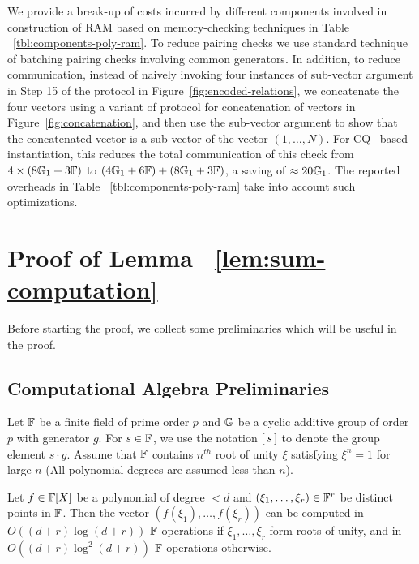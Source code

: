 \smallskip

We provide a break-up of costs incurred by different components involved in construction
of RAM based on memory-checking techniques in Table ~\ref{tbl:components-poly-ram}. To reduce pairing
checks we use standard technique of batching pairing checks involving common generators. In addition, to reduce
communication, instead of naively invoking four instances of sub-vector argument in Step 15 of the protocol
in Figure~\ref{fig:encoded-relations}, we concatenate the four vectors using a variant of protocol for
concatenation of vectors in Figure~\ref{fig:concatenation}, and then use the sub-vector argument to show that
the concatenated vector is a sub-vector of the vector $(1,\ldots,N)$. For CQ~\cite{EPRINT:EagFioGab22} based instantiation,
this reduces the total communication of this
check from $4\times (8\mathbb{G}_1 + 3\mathbb{F})$ to $(4\mathbb{G}_1+6\mathbb{F}) + (8\mathbb{G}_1 + 3\mathbb{F})$, a saving of $\approx 20\mathbb{G}_1$. The reported
overheads in Table ~\ref{tbl:components-poly-ram} take into account such optimizations.

\section{Proof of Lemma ~\ref{lem:sum-computation}}
Before starting the proof, we collect some preliminaries which will be useful in the proof.

\subsection{Computational Algebra Preliminaries}\label{subsec:comp-algebra-app}
Let $\mathbb{F}$ be a finite field of prime order $p$ and $\mathbb{G}$ be a cyclic additive group of order $p$ with generator $g$. For $s \in \mathbb{F}$, we use
the notation $[\,{s}\,]$ to denote the group element $s\cdot g$. Assume that $\mathbb{F}$ contains $n^{th}$ root of unity $\xi$
satisfying $\xi^n=1$ for large $n$ (All polynomial degrees are assumed less than $n$).

\begin{fact}\label{fc:fft}
Let $f\in \mathbb{F}[X]$ be a polynomial of degree $<d$ and $(\xi_1,\ldots,\xi_r)\in \mathbb{F}^r$ be distinct points in $\mathbb{F}$.
Then the vector $(f(\xi_1),\ldots,f(\xi_r))$ can be computed in $O((d+r)\log (d+r))$ $\mathbb{F}$ operations if $\xi_1,\ldots,\xi_r$ form roots
of unity, and in $O((d+r)\log^2(d+r))$ $\mathbb{F}$ operations otherwise.
\end{fact}

